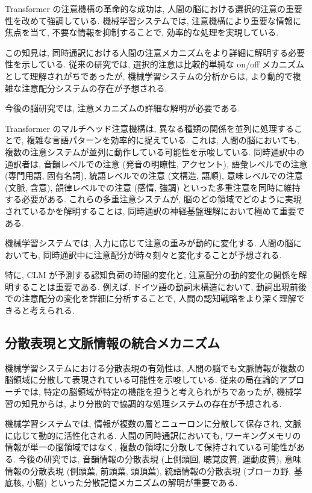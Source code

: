 Transformer の注意機構の革命的な成功は, 人間の脳における選択的注意の重要性を改めて強調している.
機械学習システムでは, 注意機構により重要な情報に焦点を当て, 不要な情報を抑制することで, 効率的な処理を実現している.

この知見は, 同時通訳における人間の注意メカニズムをより詳細に解明する必要性を示している.
従来の研究では, 選択的注意は比較的単純な on/off メカニズムとして理解されがちであったが, 機械学習システムの分析からは, より動的で複雑な注意配分システムの存在が予想される.

今後の脳研究では, 注意メカニズムの詳細な解明が必要である.

Transformer のマルチヘッド注意機構は, 異なる種類の関係を並列に処理することで, 複雑な言語パターンを効率的に捉えている.
これは, 人間の脳においても, 複数の注意システムが並列に動作している可能性を示唆している.
同時通訳中の通訳者は, 音韻レベルでの注意 (発音の明瞭性, アクセント), 語彙レベルでの注意 (専門用語, 固有名詞), 統語レベルでの注意 (文構造, 語順), 意味レベルでの注意 (文脈, 含意), 韻律レベルでの注意 (感情, 強調) といった多重注意を同時に維持する必要がある.
これらの多重注意システムが, 脳のどの領域でどのように実現されているかを解明することは, 同時通訳の神経基盤理解において極めて重要である.

機械学習システムでは, 入力に応じて注意の重みが動的に変化する.
人間の脳においても, 同時通訳中に注意配分が時々刻々と変化することが予想される.

特に, CLM が予測する認知負荷の時間的変化と, 注意配分の動的変化の関係を解明することは重要である.
例えば, ドイツ語の動詞末構造において, 動詞出現前後での注意配分の変化を詳細に分析することで, 人間の認知戦略をより深く理解できると考えられる.

\subsection{分散表現と文脈情報の統合メカニズム}

機械学習システムにおける分散表現の有効性は, 人間の脳でも文脈情報が複数の脳領域に分散して表現されている可能性を示唆している.
従来の局在論的アプローチでは, 特定の脳領域が特定の機能を担うと考えられがちであったが, 機械学習の知見からは, より分散的で協調的な処理システムの存在が予想される.

機械学習システムでは, 情報が複数の層とニューロンに分散して保存され, 文脈に応じて動的に活性化される.
人間の同時通訳においても, ワーキングメモリの情報が単一の脳領域ではなく, 複数の領域に分散して保持されている可能性がある.
今後の研究では, 音韻情報の分散表現 (上側頭回, 聴覚皮質, 運動皮質), 意味情報の分散表現 (側頭葉, 前頭葉, 頭頂葉), 統語情報の分散表現 (ブローカ野, 基底核, 小脳) といった分散記憶メカニズムの解明が重要である.


